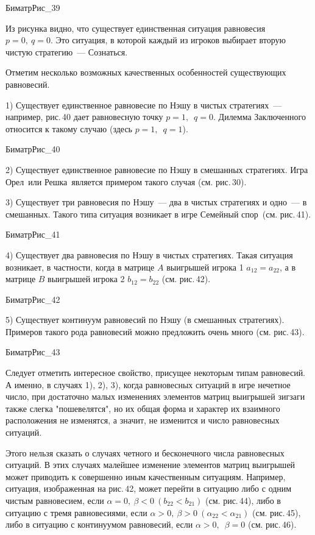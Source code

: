 БиматрРис_39


Из рисунка видно, что
существует единственная ситуация равновесия $p=0,~q=0$.  Это
ситуация, в которой каждый из игроков выбирает вторую чистую
стратегию~--- Сознаться.

Отметим несколько возможных качественных особенностей существующих
равновесий.

1) Существует единственное равновесие по Нэшу в чистых стратегиях~---
например, рис.\,40 дает равновесную точку $p=1,$\, $q=0.$ Дилемма
Заключенного\, относится к такому случаю (здесь $p=1,$\, $q=1$).


БиматрРис_40


2) Существует единственное равновесие по Нэшу в смешанных стратегиях.
Игра Орел\, или Решка\, является примером такого случая (см. рис.\,30).

3) Существует три равновесия по Нэшу~--- два в чистых стратегиях и одно~--- в
смешанных.  Такого типа ситуация возникает в игре Семейный спор\,
(см. рис.\,41).


БиматрРис_41



4) Существует два равновесия по Нэшу в чистых стратегиях.
Такая ситуация возникает, в частности, когда в матрице $A$
выигрышей игрока 1 $a_{12}=a_{22}$,
а в матрице $B $ выигрышей игрока 2 $ b_{12}=b_{22}$ (см. рис.\,42).


БиматрРис_42


5) Существует континуум равновесий по Нэшу (в смешанных стратегиях).
Примеров такого рода равновесий можно предложить очень много
(см.  рис.\,43).


БиматрРис_43



Следует отметить интересное свойство,
присущее некоторым типам равновесий.  А именно, в случаях 1), 2), 3),
когда равновесных ситуаций в игре  нечетное число, при достаточно
малых изменениях элементов матриц выигрышей зигзаги также слегка
"пошевелятся", но их общая форма и характер их взаимного расположения
не изменятся, а значит, не изменится и число равновесных ситуаций.

Этого нельзя сказать о случаях четного и бесконечного числа
равновесных ситуаций. В этих случаях малейшее изменение элементов
матриц выигрышей может приводить к совершенно иным качественным
ситуациям. Например, ситуация, изображенная на рис.\,42,  может
перейти в ситуацию либо с одним чистым равновесием, если $\alpha
=0,~\beta <0~(b_{22}<b_{21})$ (см. рис.\,44), либо в ситуацию с
тремя равновесиями, если $\alpha >0,~\beta >0~(\alpha _{22}<\alpha
_{21})$ (см. рис.\,45), либо в ситуацию с континуумом равновесий,
если $\alpha >0,$\, $\beta =0 $ (см. рис.\,46).


